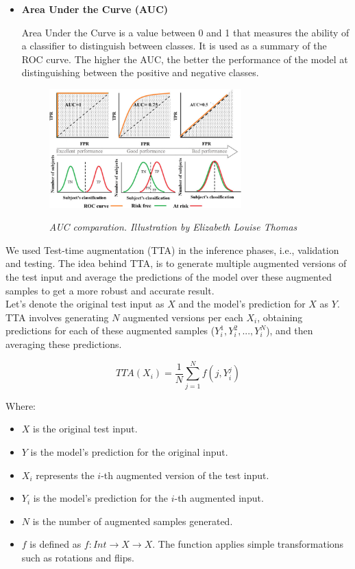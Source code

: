 \begin{itemize}
  \item {\bf Area Under the Curve (AUC)}

  Area Under the Curve is a value between 0 and 1 that measures the
  ability of a classifier to distinguish between classes. It is used as a summary of
  the ROC curve. The higher the AUC, the better the performance of the model at
  distinguishing between the positive and negative classes.

  \begin{figure}[H]
    \centering
    \includegraphics[width=0.7\textwidth]{imatges/validation-strategy/auc.png}
    \caption[AUC-ROC performance]{\textit{AUC comparation. Illustration by Elizabeth Louise Thomas}}
    {\label{fig:auc-roc}}
  \end{figure}

\end{itemize}

We used Test-time augmentation (TTA) \cite{TTA} in the inference phases, i.e., validation
and testing. The idea behind TTA, is to generate multiple augmented versions of
the test input and average the predictions of the model over these augmented
samples to get a more robust and accurate result. \\

Let's denote the original test input as \(X\) and the model's prediction for
\(X\) as \(Y\). TTA involves generating \(N\) augmented versions per each
\(X_i\), obtaining predictions for each of these augmented samples (\(Y_i^1, Y_i^2,
..., Y_i^N\)), and then averaging these predictions.

\[ TTA(X_i) = \frac{1}{N} \sum_{j=1}^{N} f(j, Y_i^j) \]

Where:

\begin{itemize}
  \item \(X\) is the original test input.
  \item \(Y\) is the model's prediction for the original input.
  \item \(X_i\) represents the \(i\)-th augmented version of the test input.
  \item \(Y_i\) is the model's prediction for the \(i\)-th augmented input.
  \item \(N\) is the number of augmented samples generated.
  \item \(f\) is defined as \(f: Int \rightarrow X \rightarrow X\). The
    function applies simple transformations such as rotations and flips.
\end{itemize}


